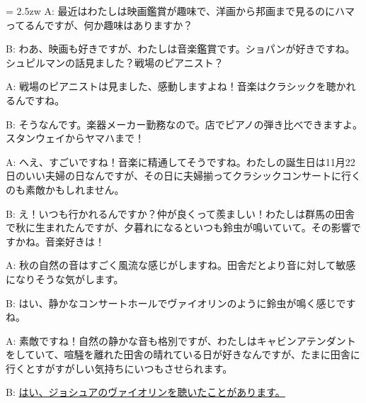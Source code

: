 \documentclass[11pt]{amsart}
\title{}
\author{}
\newenvironment{hangall}[1]{\hangindent = 2.5zw\everypar{\hangindent = 2.5zw}}{}
\begin{document}
\maketitle
\begin{hangall}{}%
A: 最近はわたしは映画鑑賞が趣味で、洋画から邦画まで見るのにハマってるんですが、何か趣味はありますか？

B: わあ、映画も好きですが、わたしは音楽鑑賞です。ショパンが好きですね。シュピルマンの話見ました？戦場のピアニスト？

A: 戦場のピアニストは見ました、感動しますよね！音楽はクラシックを聴かれるんですね。

B: そうなんです。楽器メーカー勤務なので。店でピアノの弾き比べできますよ。スタンウェイからヤマハまで！

A: へえ、すごいですね！音楽に精通してそうですね。わたしの誕生日は11月22日のいい夫婦の日なんですが、その日に夫婦揃ってクラシックコンサートに行くのも素敵かもしれません。

B: え！いつも行かれるんですか？仲が良くって羨ましい！わたしは群馬の田舎で秋に生まれたんですが、夕暮れになるといつも鈴虫が鳴いていて。その影響ですかね。音楽好きは！

A: 秋の自然の音はすごく風流な感じがしますね。田舎だとより音に対して敏感になりそうな気がします。

B: はい、静かなコンサートホールでヴァイオリンのように鈴虫が鳴く感じですね。

A: 素敵ですね！自然の静かな音も格別ですが、わたしはキャビンアテンダントをしていて、喧騒を離れた田舎の晴れている日が好きなんですが、たまに田舎に行くとすがすがしい気持ちにいつもさせられます。

B: \ul{はい、ジョシュアのヴァイオリンを聴いたことがあります。}\end{hangall}
\end{document}

